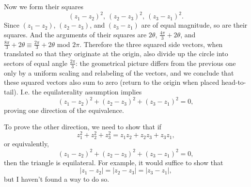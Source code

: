 \documentclass[12pt]{article}
\begin{document}
\begin{description}
  Now we form their squares
  $$
  (z_1 - z_2)^2, ~ (z_2 - z_3)^2, ~ (z_3 - z_1)^2.
  $$
  Since $(z_1 - z_2)$, $(z_2 - z_3)$, and $(z_3 - z_1)$ are of equal magnitude,
  so are their squares. And the arguments of their squares are $2\theta$,
  $\frac{4\pi}{3} + 2\theta$, and
  $\frac{8\pi}{3} + 2\theta \equiv \frac{2\pi}{3} + 2\theta$ mod
  $2\pi$. Therefore the three squared side vectors, when translated so that
  they originate at the origin, also divide up the circle into sectors of equal
  angle $\frac{2\pi}{3}$: the geometrical picture differs from the previous one
  only by a uniform scaling and relabeling of the vectors, and we conclude that
  these squared vectors also sum to zero (return to the origin when placed
  head-to-tail). I.e. the equilaterality assumption implies
  $$
  (z_1 - z_2)^2 + (z_2 - z_3)^2 + (z_3 - z_1)^2 = 0,
  $$
  proving one direction of the equivalence.

  To prove the other direction, we need to show that if
  $$
  z_1^2 + z_2^2 + z_3^2 = z_1z_2 + z_2z_3 + z_3z_1,
  $$
  or equivalently,
  $$
  (z_1 - z_2)^2 + (z_2 - z_3)^2 + (z_3 - z_1)^2 = 0,
  $$
  then the triangle is equilateral. For example, it would suffice to show that
  $$
  |z_1 - z_2| = |z_2 - z_3| = |z_3 - z_1|,
  $$
  but I haven't found a way to do so.




\end{description}
\end{document}
